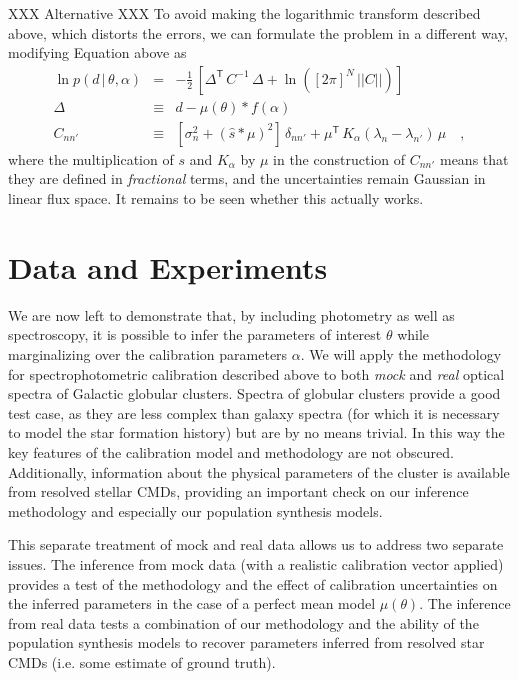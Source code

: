 \documentclass[iop,numberedappendix]{emulateapj}
\newcommand{\transpose}[1]{{#1}^{\!\mathsf T}}
\newcommand{\given}{\,|\,}
\renewcommand{\det}[1]{||{#1}||}
\begin{document}
XXX Alternative XXX
To avoid making the logarithmic transform described above, which
distorts the errors, we can formulate the problem in a different way,
modifying Equation \label{eq:spectroscopicLF} above as 
\begin{eqnarray}\label{eq:spectroscopicLF_v2}
\ln p(d\given\theta,\alpha) &=&
                                -\frac{1}{2}\,\left[\transpose{\Delta}\,C^{-1}\,\Delta
                                + \ln([2\pi]^N\,\det{C}) \right]
\\
\Delta &\equiv& d - \mu(\theta) * f(\alpha) 
\\
C_{nn'} &\equiv& [\sigma_n^2 + (\hat{s} * \mu)^2]\,\delta_{nn'} +
\transpose{\mu} \, K_\alpha(\lambda_n - \lambda_{n'}) \, \mu
\quad ,
\end{eqnarray}
where the multiplication of $s$ and $K_\alpha$ by $\mu$ in the
construction of $C_{nn'}$ means that they are defined in
\emph{fractional} terms, and the uncertainties remain Gaussian in
linear flux space.  It remains to be seen whether this actually works.



\section{Data and Experiments}

We are now left to demonstrate that, by including photometry as well
as spectroscopy, it is possible to infer the parameters of interest
$\theta$ while marginalizing over the calibration parameters $\alpha$.
We will apply the methodology for spectrophotometric calibration
described above to both \emph{mock} and \emph{real} optical spectra of
Galactic globular clusters.  Spectra of globular clusters provide a good test case,
as they are less complex than galaxy spectra (for which it is
necessary to model the star formation history) but are by no means
trivial. In this way the key features of the calibration model and
methodology are not obscured.  Additionally, information
about the physical parameters of the cluster is available from
resolved stellar CMDs, providing an important check on our inference methodology
and especially our population synthesis models.

This separate treatment of mock and real data allows us to address two
separate issues.  The inference from mock data (with a realistic
calibration vector applied) provides a test of the methodology and the
effect of calibration uncertainties on the inferred parameters in the
case of a perfect mean model $\mu(\theta)$.  The inference from real
data tests a combination of our methodology and the ability of the
population synthesis models to recover parameters inferred from
resolved star CMDs (i.e. some estimate of ground truth).
\end{document}
